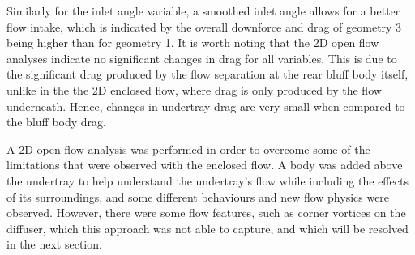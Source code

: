\noindent Similarly for the inlet angle variable, a smoothed inlet angle allows for a better flow intake, which is indicated by the overall downforce and drag of geometry 3 being higher than for geometry 1. It is worth noting that the 2D open flow analyses indicate no significant changes in drag for all variables. This is due to the significant drag produced by the flow separation at the rear bluff body itself, unlike in the the 2D enclosed flow, where drag is only produced by the flow underneath. Hence, changes in undertray drag are very small when compared to the bluff body drag.

\noindent A 2D open flow analysis was performed in order to overcome some of the limitations that were observed with the enclosed flow. A body was added above the undertray to help understand the undertray's flow while including the effects of its surroundings, and some different behaviours and new flow physics were observed. However, there were some flow features, such as corner vortices on the diffuser, which this approach was not able to capture, and which  will be resolved in the next section.



